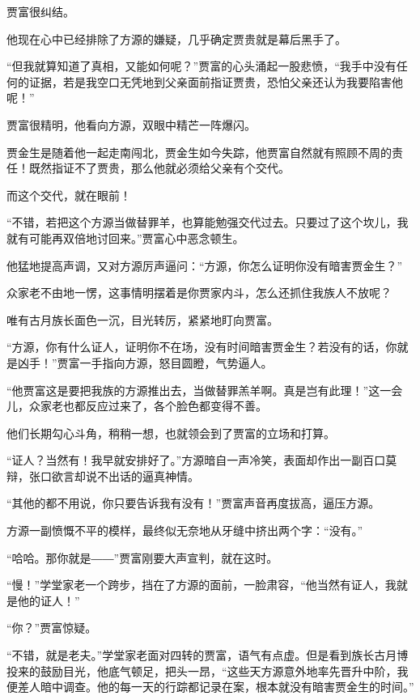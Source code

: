 
\begin{this_body}

贾富很纠结。

他现在心中已经排除了方源的嫌疑，几乎确定贾贵就是幕后黑手了。

“但我就算知道了真相，又能如何呢？”贾富的心头涌起一股悲愤，“我手中没有任何的证据，若是我空口无凭地到父亲面前指证贾贵，恐怕父亲还认为我要陷害他呢！”

贾富很精明，他看向方源，双眼中精芒一阵爆闪。

贾金生是随着他一起走南闯北，贾金生如今失踪，他贾富自然就有照顾不周的责任！既然指证不了贾贵，那么他就必须给父亲有个交代。

而这个交代，就在眼前！

“不错，若把这个方源当做替罪羊，也算能勉强交代过去。只要过了这个坎儿，我就有可能再双倍地讨回来。”贾富心中恶念顿生。

他猛地提高声调，又对方源厉声逼问：“方源，你怎么证明你没有暗害贾金生？”

众家老不由地一愣，这事情明摆着是你贾家内斗，怎么还抓住我族人不放呢？

唯有古月族长面色一沉，目光转厉，紧紧地盯向贾富。

“方源，你有什么证人，证明你不在场，没有时间暗害贾金生？若没有的话，你就是凶手！”贾富一手指向方源，怒目圆瞪，气势逼人。

“他贾富这是要把我族的方源推出去，当做替罪羔羊啊。真是岂有此理！”这一会儿，众家老也都反应过来了，各个脸色都变得不善。

他们长期勾心斗角，稍稍一想，也就领会到了贾富的立场和打算。

“证人？当然有！我早就安排好了。”方源暗自一声冷笑，表面却作出一副百口莫辩，张口欲言却说不出话的逼真神情。

“其他的都不用说，你只要告诉我有没有！”贾富声音再度拔高，逼压方源。

方源一副愤慨不平的模样，最终似无奈地从牙缝中挤出两个字：“没有。”

“哈哈。那你就是――”贾富刚要大声宣判，就在这时。

“慢！”学堂家老一个跨步，挡在了方源的面前，一脸肃容，“他当然有证人，我就是他的证人！”

“你？”贾富惊疑。

“不错，就是老夫。”学堂家老面对四转的贾富，语气有点虚。但是看到族长古月博投来的鼓励目光，他底气顿足，把头一昂，“这些天方源意外地率先晋升中阶，我便差人暗中调查。他的每一天的行踪都记录在案，根本就没有暗害贾金生的时间。”


\end{this_body}
